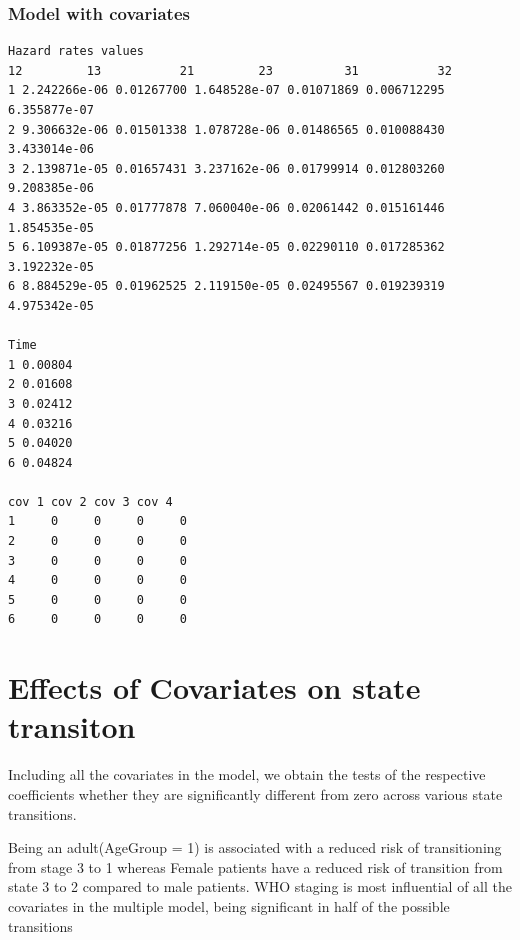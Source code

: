 \documentclass[11pt]{article}
\begin{document}
\subsubsection{Model with covariates}

\begin{verbatim}
Hazard rates values 
12         13           21         23          31           32
1 2.242266e-06 0.01267700 1.648528e-07 0.01071869 0.006712295 6.355877e-07
2 9.306632e-06 0.01501338 1.078728e-06 0.01486565 0.010088430 3.433014e-06
3 2.139871e-05 0.01657431 3.237162e-06 0.01799914 0.012803260 9.208385e-06
4 3.863352e-05 0.01777878 7.060040e-06 0.02061442 0.015161446 1.854535e-05
5 6.109387e-05 0.01877256 1.292714e-05 0.02290110 0.017285362 3.192232e-05
6 8.884529e-05 0.01962525 2.119150e-05 0.02495567 0.019239319 4.975342e-05

Time
1 0.00804
2 0.01608
3 0.02412
4 0.03216
5 0.04020
6 0.04824

cov 1 cov 2 cov 3 cov 4
1     0     0     0     0
2     0     0     0     0
3     0     0     0     0
4     0     0     0     0
5     0     0     0     0
6     0     0     0     0
\end{verbatim}


\section{Effects of Covariates on state transiton}

Including all the covariates in the model, we obtain the tests of the respective coefficients whether they are significantly different from zero across various state transitions.

Being an adult(AgeGroup = 1) is associated with a reduced risk of transitioning from stage 3 to 1 whereas Female patients have a reduced risk of transition from state 3 to 2 compared to male patients. WHO staging is most influential of all the covariates in the multiple model, being significant in half of the possible transitions
\end{document}
